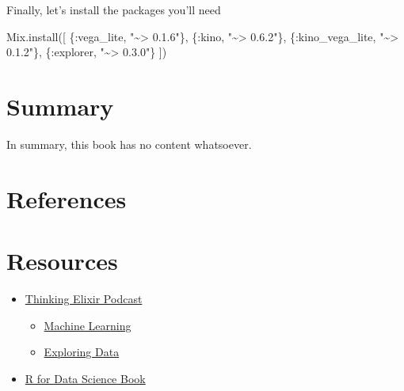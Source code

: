 \documentclass[
  letterpaper,
  DIV=11,
  numbers=noendperiod]{scrreprt}
\newenvironment{Shaded}{\begin{snugshade}}{\end{snugshade}}
\newcommand{\ConstantTok}[1]{\textcolor[rgb]{0.56,0.35,0.01}{#1}}
\newcommand{\NormalTok}[1]{\textcolor[rgb]{0.00,0.23,0.31}{#1}}
\newcommand{\OperatorTok}[1]{\textcolor[rgb]{0.37,0.37,0.37}{#1}}
\newcommand{\StringTok}[1]{\textcolor[rgb]{0.13,0.47,0.30}{#1}}
\newcommand{\VariableTok}[1]{\textcolor[rgb]{0.07,0.07,0.07}{#1}}
\providecommand{\tightlist}{%
  \setlength{\itemsep}{0pt}\setlength{\parskip}{0pt}}\usepackage{longtable,booktabs,array}
\newlength{\cslhangindent}
\newlength{\cslentryspacingunit} %
\newenvironment{CSLReferences}[2] %
 {%
  \setlength{\parindent}{0pt}
  \ifodd #1
  \let\oldpar\par
  \def\par{\hangindent=\cslhangindent\oldpar}
  \fi
  \setlength{\parskip}{#2\cslentryspacingunit}
 }%
 {}
\begin{document}
Finally, let's install the packages you'll need

\begin{Shaded}
\begin{Highlighting}[]
\ConstantTok{Mix}\OperatorTok{.}\NormalTok{install([}
\NormalTok{  \{}\VariableTok{:vega\_lite}\NormalTok{, }\StringTok{"\textasciitilde{}\textgreater{} 0.1.6"}\NormalTok{\},}
\NormalTok{  \{}\VariableTok{:kino}\NormalTok{, }\StringTok{"\textasciitilde{}\textgreater{} 0.6.2"}\NormalTok{\},}
\NormalTok{  \{}\VariableTok{:kino\_vega\_lite}\NormalTok{, }\StringTok{"\textasciitilde{}\textgreater{} 0.1.2"}\NormalTok{\},}
\NormalTok{  \{}\VariableTok{:explorer}\NormalTok{, }\StringTok{"\textasciitilde{}\textgreater{} 0.3.0"}\NormalTok{\}}
\NormalTok{])}
\end{Highlighting}
\end{Shaded}


\hypertarget{summary}{%
\chapter{Summary}\label{summary}}

In summary, this book has no content whatsoever.


\hypertarget{references}{%
\chapter*{References}\label{references}}

\hypertarget{refs}{}
\begin{CSLReferences}{0}{0}
\end{CSLReferences}


\hypertarget{resources}{%
\chapter*{Resources}\label{resources}}

\begin{itemize}
\tightlist
\item
  \href{https://podcast.thinkingelixir.com}{Thinking Elixir Podcast}

  \begin{itemize}
  \tightlist
  \item
    \href{https://podcast.thinkingelixir.com/102}{Machine Learning}
  \item
    \href{https://podcast.thinkingelixir.com/104}{Exploring Data}
  \end{itemize}
\item
  \href{https://r4ds.had.co.nz/}{R for Data Science Book}
\end{itemize}
\end{document}
